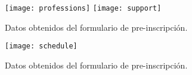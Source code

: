 \begin{frame}
	\begin{figure}[ht]
		\centering
		\texttt{[image: professions]}
		\texttt{[image: support]}
		\caption{Datos obtenidos del formulario de pre-inscripción.}
	\end{figure}
\end{frame}

\begin{frame}
	\begin{figure}[ht!]
		\centering
		\texttt{[image: schedule]}
		\caption{Datos obtenidos del formulario de pre-inscripción.}
	\end{figure}
\end{frame}
